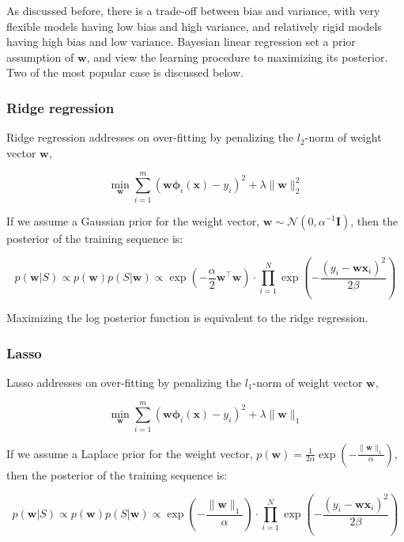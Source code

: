 \documentclass{article}
\begin{document}
	As discussed before, there is a trade-off between bias and variance, with very flexible models having low bias and high variance, and relatively rigid models having high bias and low variance. Bayesian linear regression set a prior assumption of $\mathbf{w}$, and view the learning procedure to maximizing its posterior. Two of the most popular case is discussed below. 

\subsubsection{Ridge regression}

	Ridge regression addresses on over-fitting by penalizing the $l_2$-norm of weight vector $\mathbf{w}$,
	
	\begin{equation*}
	\min_\mathbf{w} \sum_{i=1}^m (\mathbf{w\phi}_i(\mathbf{x}) - y_i)^2 + \lambda\|\mathbf{w}\|^2_2
	\end{equation*}

	If we assume a Gaussian prior for the weight vector, $\mathbf{w}\sim\mathcal{N}(0,\alpha^{-1}\mathbf{I})$, then the posterior of the training sequence is:
	
	\begin{equation}
	p(\mathbf{w}|S) \propto p(\mathbf{w}) p(S|\mathbf{w}) \propto \exp \left( -\frac{\alpha}{2} \mathbf{w}^\top \mathbf{w} \right) \cdot \prod_{i=1}^N \exp \left( -\frac{(y_i-\mathbf{wx}_i)^2}{2\beta} \right) 
	\end{equation}
	
Maximizing the log posterior function is equivalent to the ridge regression.
	
	
\subsubsection{Lasso}

	Lasso addresses on over-fitting by penalizing the $l_1$-norm of weight vector $\mathbf{w}$,
		
	\begin{equation*}
	\min_\mathbf{w} \sum_{i=1}^m (\mathbf{w\phi}_i(\mathbf{x}) - y_i)^2 + \lambda\|\mathbf{w}\|_1
	\end{equation*}
	
	If we assume a Laplace prior for the weight vector, $p(\mathbf{w})=\frac{1}{2\alpha} \exp \left( -\frac{\|\mathbf{w}\|_1}{\alpha} \right)$, then the posterior of the training sequence is:
	
	\begin{equation}
	p(\mathbf{w}|S) \propto p(\mathbf{w}) p(S|\mathbf{w}) \propto \exp \left( -\frac{\|\mathbf{w}\|_1}{\alpha} \right) \cdot \prod_{i=1}^N \exp \left( -\frac{(y_i-\mathbf{wx}_i)^2}{2\beta} \right)
	\end{equation}
\end{document}
